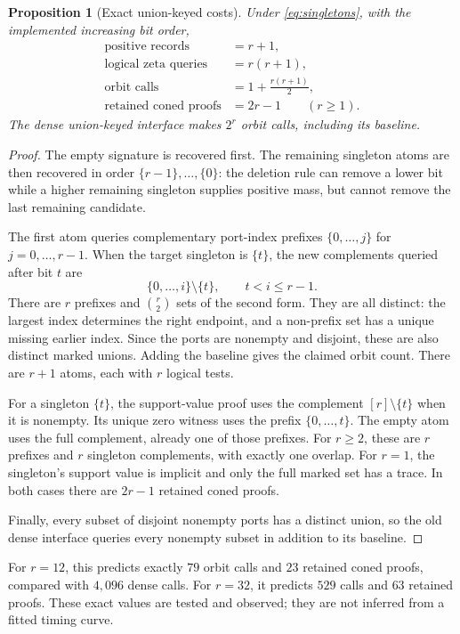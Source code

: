 \documentclass[11pt,letterpaper]{article}
\newtheorem{proposition}[theorem]{Proposition}
\theoremstyle{definition}
\newcommand{\full}{[r]}
\begin{document}
\begin{proposition}[Exact union-keyed costs]\label{prop:singleton-cost}
Under \eqref{eq:singletons}, with the implemented increasing bit order,
\begin{align*}
 \text{positive records}&=r+1,\\
 \text{logical zeta queries}&=r(r+1),\\
 \text{orbit calls}&=1+\frac{r(r+1)}2,\\
 \text{retained coned proofs}&=2r-1\qquad(r\ge1).
\end{align*}
The dense union-keyed interface makes $2^r$ orbit calls, including its
baseline.
\end{proposition}
\begin{proof}
The empty signature is recovered first. The remaining singleton atoms are
then recovered in order $\{r-1\},\ldots,\{0\}$: the deletion rule can
remove a lower bit while a higher remaining singleton supplies positive
mass, but cannot remove the last remaining candidate.

The first atom queries complementary port-index prefixes
$\{0,\ldots,j\}$ for $j=0,\ldots,r-1$. When the target singleton is
$\{t\}$, the new complements queried after bit $t$ are
\[
 \{0,\ldots,i\}\setminus\{t\},\qquad t<i\le r-1.
\]
There are $r$ prefixes and $\binom r2$ sets of the second form. They are
all distinct: the largest index determines the right endpoint, and a
non-prefix set has a unique missing earlier index. Since the ports are
nonempty and disjoint, these are also distinct marked unions. Adding the
baseline gives the claimed orbit count. There are $r+1$ atoms, each with
$r$ logical tests.

For a singleton $\{t\}$, the support-value proof uses the complement
$\full\setminus\{t\}$ when it is nonempty. Its unique zero witness uses
the prefix $\{0,\ldots,t\}$. The empty atom uses the full complement,
already one of those prefixes. For $r\ge2$, these are $r$ prefixes and
$r$ singleton complements, with exactly one overlap. For $r=1$, the
singleton's support value is implicit and only the full marked set has a
trace. In both cases there are $2r-1$ retained coned proofs.

Finally, every subset of disjoint nonempty ports has a distinct union, so
the old dense interface queries every nonempty subset in addition to its
baseline.
\end{proof}

For $r=12$, this predicts exactly $79$ orbit calls and $23$ retained coned
proofs, compared with $4,096$ dense calls. For $r=32$, it predicts $529$
calls and $63$ retained proofs. These exact values are tested and observed;
they are not inferred from a fitted timing curve.
\end{document}
